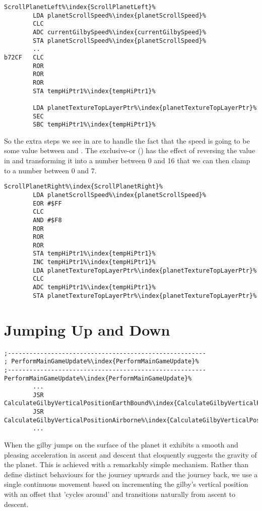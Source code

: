 \begin{lstlisting}[escapechar=\%]
ScrollPlanetLeft%\index{ScrollPlanetLeft}%
        LDA planetScrollSpeed%\index{planetScrollSpeed}%
        CLC
        ADC currentGilbySpeed%\index{currentGilbySpeed}%
        STA planetScrollSpeed%\index{planetScrollSpeed}%
        ..
b72CF   CLC
        ROR
        ROR
        ROR
        STA tempHiPtr1%\index{tempHiPtr1}%

        LDA planetTextureTopLayerPtr%\index{planetTextureTopLayerPtr}%
        SEC
        SBC tempHiPtr1%\index{tempHiPtr1}%
\end{lstlisting}

So the extra steps we see in  are to handle the fact that the speed is going to be some value
between  and . The exclusive-or () has the effect of reversing the value in 
and transforming it into a number between 0 and 16 that we can then clamp to a number between 0 and 7.


\begin{lstlisting}[escapechar=\%]
ScrollPlanetRight%\index{ScrollPlanetRight}%   
        LDA planetScrollSpeed%\index{planetScrollSpeed}%
        EOR #$FF
        CLC
        AND #$F8
        ROR
        ROR
        ROR
        STA tempHiPtr1%\index{tempHiPtr1}%
        INC tempHiPtr1%\index{tempHiPtr1}%
        LDA planetTextureTopLayerPtr%\index{planetTextureTopLayerPtr}%
        CLC
        ADC tempHiPtr1%\index{tempHiPtr1}%
        STA planetTextureTopLayerPtr%\index{planetTextureTopLayerPtr}%
\end{lstlisting}


\section{Jumping Up and Down}
\begin{lstlisting}[caption=The routines responsible for updating the Gilby's vertical position.,escapechar=\%]
;-------------------------------------------------------
; PerformMainGameUpdate%\index{PerformMainGameUpdate}%
;-------------------------------------------------------
PerformMainGameUpdate%\index{PerformMainGameUpdate}%
        ...
        JSR CalculateGilbyVerticalPositionEarthBound%\index{CalculateGilbyVerticalPositionEarthBound}%
        JSR CalculateGilbyVerticalPositionAirborne%\index{CalculateGilbyVerticalPositionAirborne}%
        ...

\end{lstlisting}
When the gilby jumps on the surface of the planet it exhibits a smooth and pleasing acceleration in ascent and descent that
eloquently suggests the gravity of the planet. This is achieved with a remarkably simple mechanism. Rather than define
distinct behaviours for the journey upwards and the journey back, we use a single continuous movement based on incrementing
the gilby's vertical position with an offset that 'cycles around' and transitions naturally from ascent to descent.

